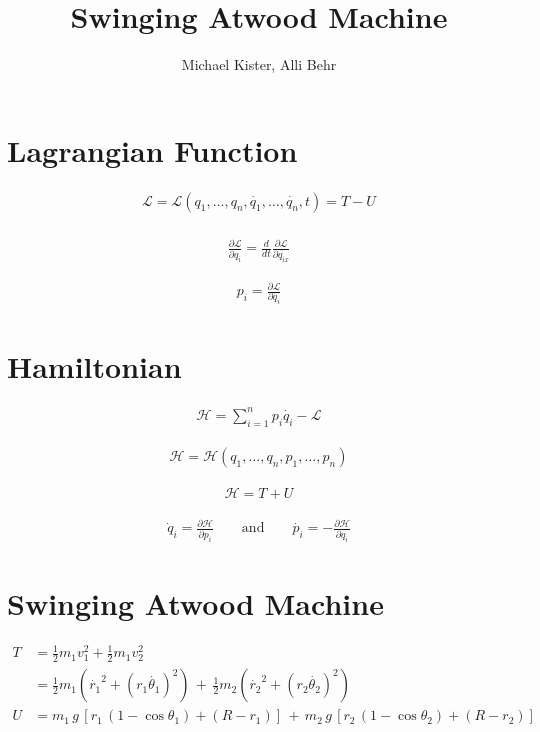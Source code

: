 \documentclass{article}
\title{Swinging Atwood Machine}
\author{Michael Kister, Alli Behr}
\date{}
\begin{document}
\maketitle

\section*{Lagrangian Function}

\begin{gather*}
\mathscr{L} = \mathscr{L}(q_{1}, \ldots, q_{n}, \dot{q_{1}}, \ldots, \dot{q_{n}}, t) = T - U \\
\end{gather*}

\begin{gather*}
\frac{\partial \mathscr{L}}{\partial q_{i}} = \frac{d}{dt}\frac{\partial \mathscr{L}}{\partial \dot{q_{ix}}}
\end{gather*}

\begin{gather*}
p_{i} = \frac{\partial \mathscr{L}}{\partial \dot{q_{i}}}
\end{gather*}

\section*{Hamiltonian}

\begin{gather*}
\mathscr{H} = \sum_{i = 1}^{n}p_{i}\dot{q_{i}} - \mathscr{L}
\end{gather*}

\begin{gather*}
\mathscr{H} = \mathscr{H}(q_{1}, \ldots, q_{n}, p_{1}, \ldots, p_{n})
\end{gather*}

\begin{gather*}
\mathscr{H} = T + U
\end{gather*}

\begin{gather*}
\dot{q}_{i} = \frac{\partial \mathscr{H}}{\partial p_{i}} \qquad\text{and}\qquad \dot{p_{i}} = - \frac{\partial \mathscr{H}}{\partial q_{i}}
\end{gather*}

\section*{Swinging Atwood Machine}

\begin{align*}
T &= \frac{1}{2}m_{1}v_{1}^{2}+\frac{1}{2}m_{1}v_{2}^{2} \\
&= \frac{1}{2}m_{1}\left( \dot{r_{1}}^{2} + (r_{1}\dot{\theta_{1}})^{2} \right) \,+\, \frac{1}{2}m_{2}\left( \dot{r_{2}}^{2} + (r_{2}\dot{\theta_{2}})^{2} \right) \\
U &= m_{1} \, g \, \left[ r_{1} \, (1-\cos{\theta_{1}}) + (R - r_{1}) \right] \,+\, m_{2} \, g \, \left[ r_{2} \, (1-\cos{\theta_{2}}) + (R - r_{2})\right]
\end{align*}
\end{document}
